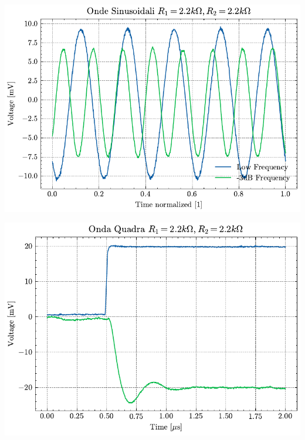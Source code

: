 \begin{minipage}{0.8\textwidth}
    \centering
    \begin{minipage}[b]{0.3\textwidth}
        \includegraphics[width=\linewidth]{analog/assets/OP27/Invertente/Sin_17k8.pdf}
    \end{minipage}
    \hfill
    \begin{minipage}[b]{0.3\textwidth} 
        \includegraphics[width=\linewidth]{analog/assets/OP27/Invertente/Square_17k8.pdf}
    \end{minipage}
    \hfill
    \begin{minipage}[b]{0.3\textwidth}

\end{minipage}
\end{minipage}
